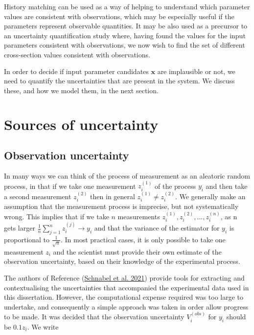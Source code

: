 \documentclass[
  12pt,
  a4paper,
  twoside]{book}
\begin{document}
History matching can be used as a way of helping to understand which parameter values are consistent with observations, which may be especially useful if the parameters represent observable quantities. It may be also used as a precursor to an uncertainty quantification study where, having found the values for the input parameters consistent with observations, we now wish to find the set of different cross-section values consistent with observations.

In order to decide if input parameter candidates \(\mathbf{x}\) are implausible or not, we need to quantify the uncertainties that are present in the system. We discuss these, and how we model them, in the next section.

\hypertarget{HM-Uncertainty}{%
\section{Sources of uncertainty}\label{HM-Uncertainty}}

\hypertarget{observation-uncertainty}{%
\subsection{Observation uncertainty}\label{observation-uncertainty}}

In many ways we can think of the process of measurement as an aleatoric random process, in that if we take one measurement \(z_i^{(1)}\) of the process \(y_i\) and then take a second measurement \(z_i^{(2)}\) then in general \(z_i^{(1)} \neq z_i^{(2)}\). We generally make an assumption that the measurement process is imprecise, but not systematically wrong. This implies that if we take \(n\) measurements \(z_i^{(1)},z_i^{(2)},...,z_i^{(n)}\), as n gets larger \(\frac{1}{n}\sum_{j=1}^n z_i^{(j)} \rightarrow y_i\) and that the variance of the estimator for \(y_i\) is proportional to \(\frac{1}{\sqrt{n}}\). In most practical cases, it is only possible to take one measurement \(z_i\) and the scientist must provide their own estimate of the observation uncertainty, based on their knowledge of the experimental process.

The authors of Reference (\protect\hyperlink{ref-Schnabel_2021}{Schnabel et al. 2021}) provide tools for extracting and contextualising the uncertainties that accompanied the experimental data used in this dissertation. However, the computational expense required was too large to undertake, and consequently a simple approach was taken in order allow progress to be made. It was decided that the observation uncertainty \(V_i^{(obs)}\) for \(y_i\) should be \(0.1z_i\). We write
\end{document}
